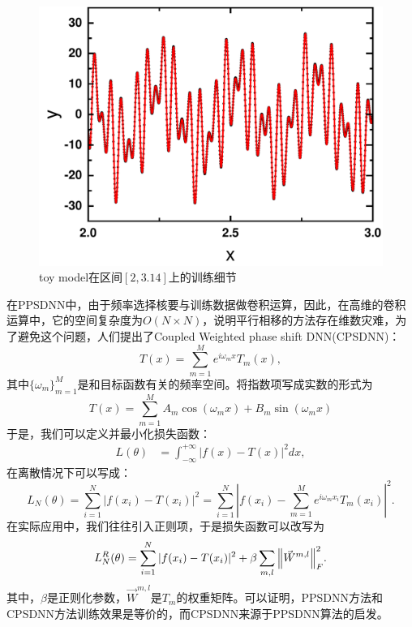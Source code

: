 \begin{figure}[htbp]
  \centering
  \includegraphics[width=0.76\linewidth]{figures/toymodel/train3.pdf}
  \caption{toy model在区间$[2,3.14]$上的训练细节}
  \label{toy3}
\end{figure}
  


  在PPSDNN中，由于频率选择核要与训练数据做卷积运算，因此，在高维的卷积运算中，它的空间复杂度为$O (N\times N)$，说明平行相移的方法存在维数灾难，为了避免这个问题，人们提出了Coupled Weighted phase shift DNN\cite{cai2020phase}(CPSDNN)：
  \begin{equation} \label{eq:CPDNNcomplex}%
    T(x)=\sum_{m=1}^{M}e^{i\omega_{m}x}T_{m}(x),
    \end{equation}
    其中$\{\omega_{m}\}_{m=1}^M$是和目标函数有关的频率空间。将指数项写成实数的形式为
    \begin{equation}\label{eq:CPDNNreal}%
      T(x)=\sum_{m=1}^{M}A_{m}\cos(\omega_{m}x)+B_{m}\sin(\omega_{m}x)
      \end{equation}
    于是，我们可以定义并最小化损失函数：
    \begin{equation}
      \begin{aligned}
      L(\theta) &= \int_{-\infty}^{+\infty}|f(x)-T(x)|^2d x,\label{eq:2}%
      \end{aligned}
      \end{equation}
      在离散情况下可以写成：
      \begin{equation}
        L_N(\theta) = \sum_{i=1}^{N}\left\vert
        f(x_{i})-T(x_{i})\right\vert ^{2}
        =\sum_{i=1}^{N}\left\vert f(x_{i})-\sum_{m=1}^{M}e^{i\omega_{m}x_{i}}T_{m}(x_{i})\right\vert ^{2}. \label{eq:Ln2}%
        \end{equation}
在实际应用中，我们往往引入正则项，于是损失函数可以改写为
\begin{equation}
  L_N^R(\theta) = \sum_{i=1}^{N}|f(x_i) - T(x_i)|^2 + \beta \sum_{m,l} \norm{\vec{W}^{m, l}}_F^2.
  \end{equation}
  其中，$\beta$是正则化参数，$\vec{W}^{m, l}$是$T_m$的权重矩阵。可以证明，PPSDNN方法和CPSDNN方法训练效果是等价的，而CPSDNN来源于PPSDNN算法的启发。

